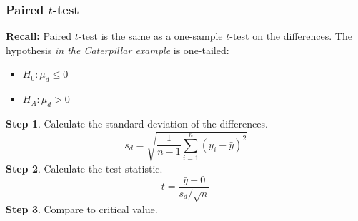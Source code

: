 \documentclass[color=usenames,dvipsnames]{beamer}\usepackage[]{graphicx}\usepackage[]{color}
\begin{document}
\begin{comment}
\begin{frame}[fragile]
  \frametitle{Is the mean of the differences $>0$?}
  \begin{center}
  \footnotesize
\texttt{[image: figure/pplot-1]}
  \end{center}
\end{frame}
\end{comment}



\begin{comment}
\begin{frame}[fragile]
  \frametitle{The differences}
\begin{center}
  \footnotesize

\texttt{[image: figure/diff-1]}
\end{center}
\end{frame}
\end{comment}






\begin{frame}[fragile]
  \frametitle{Paired $t$-test}
  {\bf Recall:} Paired $t$-test is the same as a one-sample $t$-test on the
      differences. The hypothesis \emph{in the Caterpillar example} is one-tailed:
  \begin{itemize}
    \item $H_0: \mu_d \le 0$
    \item $H_A: \mu_d > 0$
  \end{itemize}
  \pause
  \vfill
  \normalsize
  {\bf Step 1}. Calculate the standard deviation of the differences.
  \[
    s_d = \sqrt{\frac{1}{n-1} \sum_{i=1}^n
        (y_i - \bar{y})^2}%
  \]
  \pause
  \vfill
  {\bf Step 2}. Calculate the test statistic.
  \[
     t = \frac{\bar{y} - 0}{s_d/\sqrt{n}}
  \]
  {\bf Step 3}. Compare to critical value.
\end{frame}
\end{document}
